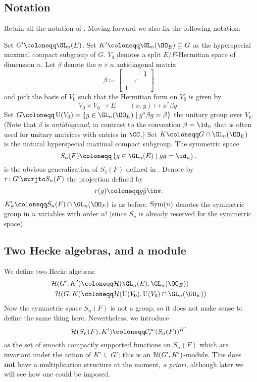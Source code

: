 \subsection{Notation}
Retain all the notation of .
Moving forward we also fix the following notation:
\begin{itemize}
  \ii Set $G' \coloneqq \GL_n(E)$.
  \ii Set $K' \coloneqq \GL_n(\OO_E) \subseteq G$ as the hyperspecial maximal compact subgroup of $G$.
  \ii $V_0$ denotes a split $E/F$-Hermitian space of dimension $n$.
  \ii Let $\beta$ denote the $n \times n$ antidiagonal matrix
  \[ \beta \coloneqq \begin{bmatrix} && 1 \\ & \iddots \\ 1 \end{bmatrix} \]
  and pick the basis of $V_0$ such that the Hermitian form on $V_0$ is given by
  \[ V_0 \times V_0 \to E \qquad (x,y) \mapsto x^\ast \beta y. \]
  \ii Set $G \coloneqq \U(V_0) = \{ g \in \GL_n(\OO_E) \mid g^\ast \beta g = \beta\}$
  the unitary group over $V_0$.
  (Note that $\beta$ is \emph{antidiagonal},
  in contrast to the convention $\beta = \id_n$
  that is often used for unitary matrices with entries in $\CC$.)
  \ii Set $K \coloneqq G \cap \GL_n(\OO_E)$ is the natural hyperspecial maximal compact subgroup.
  \ii The symmetric space
  \[ S_n(F) \coloneqq \left\{ g \in \GL_n(E) \mid g \bar g = \id_n \right\}. \]
  is the obvious generalization of $S_3(F)$ defined in .
  \ii Denote by $r \colon G' \surjto S_n(F)$ the projection defined by
  \[ r(g) \coloneqq g \bar{g}\inv. \]
  \ii $K'_S \coloneqq S_n(F) \cap \GL_n(\OO_F)$ is as before.
  \ii $\operatorname{Sym}(n)$ denotes the symmetric group in $n$ variables with order $n!$
  (since $S_n$ is already reserved for the symmetric space).
\end{itemize}

\subsection{Two Hecke algebras, and a module}
We define two Hecke algebras:
\begin{align*}
  \HH(G', K') &\coloneqq \HH(\GL_n(E), \GL_n(\OO_E)) \\
  \HH(G, K) &\coloneqq \HH(\U(V_0), \U(V_0) \cap \GL_n(\OO_E))
\end{align*}
Now the symmetric space $S_n(F)$ is not a group,
so it does not make sense to define the same thing here.
Nevertheless, we introduce
\[ \HH(S_n(F), K') \coloneqq \mathcal C_{\mathrm{c}}^{\infty}(S_n(F))^{K'} \]
as the set of smooth compactly supported functions on $S_n(F)$
which are invariant under the action of $K' \subseteq G'$;
this is an $\mathcal H(G', K')$-module.
This does \textbf{not} have a multiplication structure at the moment, \emph{a priori},
although later we will see how one could be imposed.

